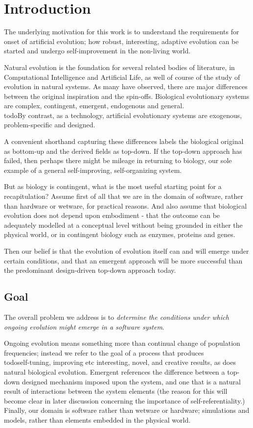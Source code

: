\documentclass[]{report}
\title{}
\author{}
\begin{document}
	
\abstract{
}
\clearpage
\chapter{Introduction}

The underlying motivation for this work is to understand the requirements for onset of artificial evolution; how robust, interesting, adaptive evolution can be started and undergo self-improvement in the non-living world.

Natural evolution is the foundation for several related bodies of literature, in Computational Intelligence and Artificial Life, as well of course of the study of evolution in natural systems. As many have observed, there are major differences between the original inspiration and the spin-offs. Biological evolutionary systems are complex, contingent, emergent, endogenous and general. \\todo{By contrast, as a technology, artificial evolutionary systems are exogenous, problem-specific and designed.}

A convenient shorthand capturing these differences labels the biological original as bottom-up and the derived fields as top-down. If the top-down approach has failed, then perhaps there might be mileage in returning to biology, our sole example of a general self-improving, self-organizing system.

But as biology is contingent, what is the most useful starting point for a recapitulation? Assume first of all that we are in the domain of software, rather than hardware or wetware, for practical reasons. And also assume that biological evolution does not depend upon embodiment - that the outcome can be adequately modelled at a conceptual level without being grounded in either the physical world, or in contingent biology such as enzymes, proteins and genes.

Then our belief is that the evolution of evolution itself can and will emerge under certain conditions, and that an emergent approach will be more successful than the predominant design-driven top-down approach today.

\section{Goal}

The overall problem we address is to \textit{determine the conditions under which ongoing evolution might emerge in a software system}. 

Ongoing evolution means something more than continual change of population frequencies; instead we refer to the goal of a process that produces \\todo{self-tuning, improving etc} interesting, novel, and creative results, as does natural biological evolution. Emergent references the difference between a top-down designed mechanism imposed upon the system, and one that is a natural result of interactions between the system elements (the reason for this will become clear in later discussion concerning the importance of self-referentiality.) Finally, our domain is software rather than wetware or hardware; simulations and models, rather than elements embedded in the physical world.
\end{document}
